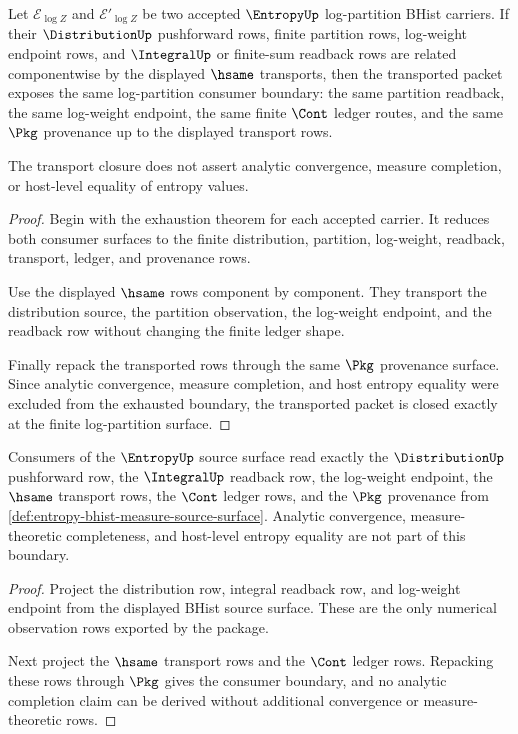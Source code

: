 \begin{theorem}
\label{thm:entropy-log-partition-transport-closure}
Let $\mathcal E_{\log Z}$ and $\mathcal E'_{\log Z}$ be two accepted
$\EntropyUp$ log-partition BHist carriers. If their $\DistributionUp$
pushforward rows, finite partition rows, log-weight endpoint rows, and
$\IntegralUp$ or finite-sum readback rows are related componentwise by the
displayed $\hsame$ transports, then the transported packet exposes the same
log-partition consumer boundary: the same partition readback, the same
log-weight endpoint, the same finite $\Cont$ ledger routes, and the same
$\Pkg$ provenance up to the displayed transport rows.

The transport closure does not assert analytic convergence, measure
completion, or host-level equality of entropy values.
\end{theorem}
\begin{proof}
Begin with the exhaustion theorem for each accepted carrier. It reduces both
consumer surfaces to the finite distribution, partition, log-weight, readback,
transport, ledger, and provenance rows.

Use the displayed $\hsame$ rows component by component. They transport the
distribution source, the partition observation, the log-weight endpoint, and
the readback row without changing the finite ledger shape.

Finally repack the transported rows through the same $\Pkg$ provenance surface.
Since analytic convergence, measure completion, and host entropy equality were
excluded from the exhausted boundary, the transported packet is closed exactly
at the finite log-partition surface.
\end{proof}

\begin{theorem}
\label{thm:entropy-distribution-integral-boundary}
Consumers of the $\EntropyUp$ source surface read exactly the
$\DistributionUp$ pushforward row, the $\IntegralUp$ readback row, the
log-weight endpoint, the $\hsame$ transport rows, the $\Cont$ ledger rows, and
the $\Pkg$ provenance from
\autoref{def:entropy-bhist-measure-source-surface}. Analytic convergence,
measure-theoretic completeness, and host-level entropy equality are not part of
this boundary.
\end{theorem}
\begin{proof}
Project the distribution row, integral readback row, and log-weight endpoint
from the displayed BHist source surface. These are the only numerical
observation rows exported by the package.

Next project the $\hsame$ transport rows and the $\Cont$ ledger rows. Repacking
these rows through $\Pkg$ gives the consumer boundary, and no analytic
completion claim can be derived without additional convergence or
measure-theoretic rows.
\end{proof}

